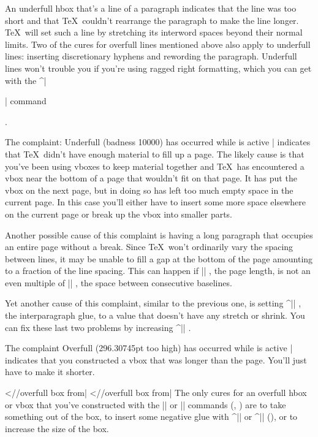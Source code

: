\li An underfull hbox that's a line of a paragraph indicates that the line was
too short and that \TeX\ couldn't rearrange the paragraph to
make the line longer.
\TeX\ will set such a line by stretching its interword spaces
beyond their normal
limits.  Two of the cures for overfull lines mentioned above
also apply to underfull lines:
inserting discretionary hyphens and rewording the paragraph.
Underfull lines
won't trouble you if you're using ragged right formatting, which you can get
with the ^|\raggedright| command \ctsref\raggedright.

\li The complaint:
\csdisplay
Underfull \vbox (badness 10000) has occurred
   while \output is active
|
indicates that \TeX\ didn't have enough material to fill up a page.  The
likely cause is that you've been using vboxes to keep material together
and \TeX\ has encountered a vbox near the bottom of a page that wouldn't fit on
that page.
It has put the vbox on the next page, but in doing so has left too much
empty space in the current page.
In this case you'll either have to insert some more space
elsewhere on the current page or break up the vbox into smaller parts.

Another possible cause of this complaint is having a long paragraph
that occupies an entire page without a break.
Since \TeX\ won't ordinarily vary the spacing between lines,
it may be unable to fill a gap at the bottom of the page
amounting to a fraction of the line spacing.
This can happen if |\vsize| \ctsref{\vsize}, the page length,
is not an even multiple of |\baselineskip| \ctsref{\baselineskip},
the space between consecutive
baselines.

Yet another cause of this complaint,
similar to the previous one, is setting ^|\parskip| \ctsref{\parskip},
the interparagraph glue, to a value that doesn't have any
stretch or shrink. You can fix these last two problems by increasing ^|\vfuzz|
\ctsref\vfuzz.

\li The complaint
\csdisplay
Overfull \vbox (296.30745pt too high) has occurred
   while \output is active
|
indicates that you constructed a vbox that was longer than the page.  You'll
just have to make it shorter.

\li 
\bix^^|\hbox//overfull box from|
\bix^^|\vbox//overfull box from|
The only cures for an overfull hbox or vbox that you've constructed
with the |\hbox| or |\vbox| commands
(\pp\xrefn\hbox, \xrefn\vbox)
are to take something out of the box, to insert some negative glue
with ^|\hss| or ^|\vss| (\xref\hss), or to increase the size
of the box.

